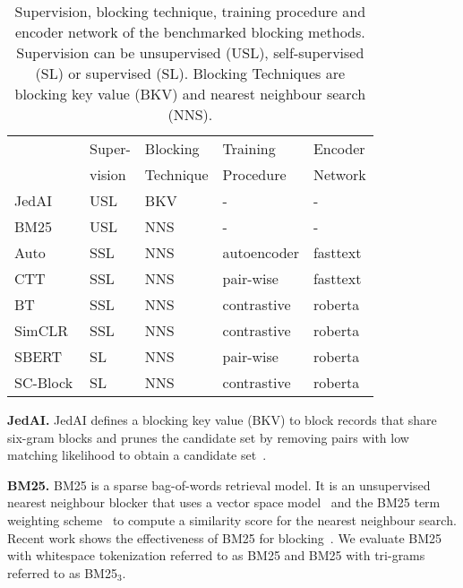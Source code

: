 \documentclass[sigconf,nonacm]{acmart}
\begin{document}
\begin{table}[]
\caption{Supervision, blocking technique, training procedure and encoder network of the benchmarked blocking methods. Supervision can be unsupervised (USL), self-supervised (SL) or supervised (SL). Blocking Techniques are blocking key value (BKV) and nearest neighbour search (NNS).}
\label{tab:blocking_methods}
\begin{tabular}{@{}lllll@{}}
\toprule
                      &  Super-      &  Blocking  &  Training      &  Encoder          \\ 
                      &  vision      &  Technique  &  Procedure      &  Network          \\ 
                      \midrule
JedAI~\cite{papadakis_three-dimensional_2020}                 &  USL     &  BKV        &   -             &  -                        \\
BM25~\cite{paulsen_sparkly_2023}                  &  USL     &  NNS        &  -             &  -                        \\
Auto~\cite{thirumuruganathan_deep_2021}          &  SSL  &  NNS        &  autoencoder  &  fasttext                 \\
CTT~\cite{thirumuruganathan_deep_2021}  &  SSL  &  NNS        &  pair-wise     &  fasttext                 \\
BT~\cite{wang_sudowoodo_2022}           &  SSL  &  NNS        &  contrastive   &  roberta \\
SimCLR~\cite{wang_sudowoodo_2022}                &  SSL  &  NNS        &  contrastive   &  roberta \\
SBERT~\cite{reimers_sentence-bert_2019}         &  SL       &  NNS        &  pair-wise     &  roberta \\
SC-Block              &  SL       &  NNS        &  contrastive   &  roberta \\ \bottomrule
\end{tabular}
\end{table}

\vspace{.1cm}\noindent\textbf{JedAI.}
JedAI defines a blocking key value (BKV) to block records that share six-gram blocks and prunes the candidate set by removing pairs with low matching likelihood to obtain a candidate set~\cite{efthymiou_parallel_2017}.


\vspace{.1cm}\noindent\textbf{BM25.} BM25 is a sparse bag-of-words retrieval model. 
It is an unsupervised nearest neighbour blocker that uses a vector space model~\cite{salton_vector_1975} and the BM25 term weighting scheme~\cite{robertson_probabilistic_2009} to compute a similarity score for the nearest neighbour search. Recent work shows the effectiveness of BM25 for blocking~\cite{paulsen_sparkly_2023}.
We evaluate BM25 with whitespace tokenization referred to as BM25 and BM25 with tri-grams referred to as BM25$_3$.
\end{document}
